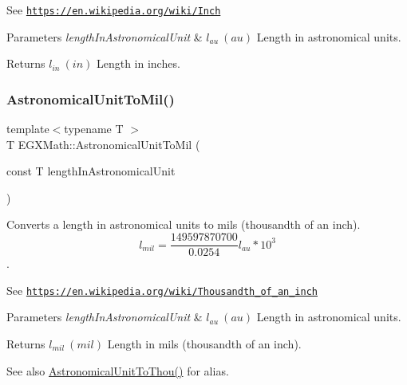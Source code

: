 See \href{https://en.wikipedia.org/wiki/Inch}{\tt https\+://en.\+wikipedia.\+org/wiki/\+Inch} 
\begin{DoxyParams}{Parameters}
{\em length\+In\+Astronomical\+Unit} & $ l_{au}\ (au)$ Length in astronomical units. \\
\hline
\end{DoxyParams}
\begin{DoxyReturn}{Returns}
$ l_{in}\ (in)$ Length in inches. 
\end{DoxyReturn}
\mbox{\label{group___e_g_x_math-_conversions-_length_conversions-_astronomical-_astronomical_unit-_imperial_ga5a4de19a0aa243fb3b3ea8e014f7c574}} 
\subsubsection{\texorpdfstring{Astronomical\+Unit\+To\+Mil()}{AstronomicalUnitToMil()}}
{\footnotesize\ttfamily template$<$typename T $>$ \\
T E\+G\+X\+Math\+::\+Astronomical\+Unit\+To\+Mil (\begin{DoxyParamCaption}\item[{const T}]{length\+In\+Astronomical\+Unit }\end{DoxyParamCaption})}



Converts a length in astronomical units to mils (thousandth of an inch). \[ l_{mil}= \frac{149597870700}{0.0254} l_{au} * 10^{3} \]. 

See \href{https://en.wikipedia.org/wiki/Thousandth_of_an_inch}{\tt https\+://en.\+wikipedia.\+org/wiki/\+Thousandth\+\_\+of\+\_\+an\+\_\+inch} 
\begin{DoxyParams}{Parameters}
{\em length\+In\+Astronomical\+Unit} & $ l_{au}\ (au)$ Length in astronomical units. \\
\hline
\end{DoxyParams}
\begin{DoxyReturn}{Returns}
$ l_{mil}\ (mil)$ Length in mils (thousandth of an inch). 
\end{DoxyReturn}
\begin{DoxySeeAlso}{See also}
\mbox{\hyperlink{group___e_g_x_math-_conversions-_length_conversions-_astronomical-_astronomical_unit-_imperial_ga6c8f186a4c27fd488b82e76d8e27f8a8}{Astronomical\+Unit\+To\+Thou()}} for alias. 
\end{DoxySeeAlso}
\mbox{\label{group___e_g_x_math-_conversions-_length_conversions-_astronomical-_astronomical_unit-_imperial_ga24da571320e08bb0a057e77e15e786b1}} 
